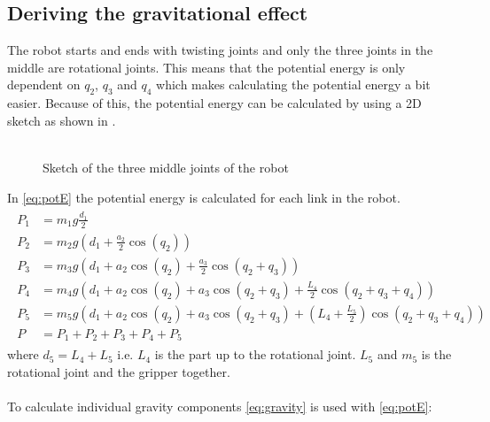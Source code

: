  \subsection{Deriving the gravitational effect}
 The robot starts and ends with twisting joints and only the three joints in the middle are rotational joints. This means that the potential energy is only dependent on $q_2$, $q_3$ and $q_4$ which makes calculating the potential energy a bit easier. Because of this, the potential energy can be calculated by using a 2D sketch as shown in .\\\\
\begin{figure}[htbp]
    \centering
    
    \caption{Sketch of the three middle joints of the robot}
    \label{draw:pot-rob}
\end{figure}
In \eqref{eq:potE} the potential energy is calculated for each link in the robot. 
 \begin{align}
    \begin{split}\label{eq:potE}
        P_1 &= m_1g\frac{d_1}{2}
        \\
        P_2 &= m_2g\left(d_1 + \frac{a_2}{2}\cos{(q_2)}\right)
        \\
        P_3 &= m_3g\left(d_1 +  a_2 \cos{(q_2)} + \frac{a_3}{2}\cos{(q_2 + q_3)} \right)
        \\
        P_4 &= m_4g\left(d_1 +  a_2 \cos{(q_2)} + a_3\cos{(q_2 + q_3)} + \frac{L_4}{2}\cos{(q_2+q_3+q_4)} \right)
        \\
        P_5 &=m_5g\left(d_1 +  a_2 \cos{(q_2)} + a_3\cos{(q_2 + q_3)} + \left(L_4 + \frac{L_5}{2} \right)\cos{(q_2+q_3+q_4)} \right)
        \\
        P &= P_1 + P_2 + P_3 + P_4 + P_5
    \end{split}   
 \end{align}    
where $d_5 = L_4+L_ 5$ i.e. $L_4$ is the part up to the rotational joint. $L_5$ and $m_5$ is the rotational joint and the gripper together.\\\\
To calculate individual gravity components \eqref{eq:gravity} is used with \eqref{eq:potE}:

